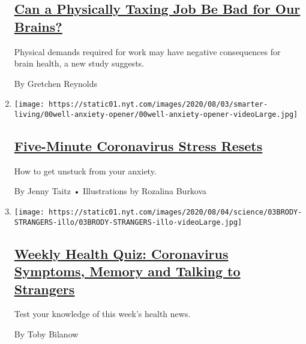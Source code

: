 \begin{enumerate}
  \hypertarget{can-a-physically-taxing-job-be-bad-for-our-brains}{%
  \subsection{\texorpdfstring{\href{/2020/08/05/well/move/can-a-physically-taxing-job-be-bad-for-our-brains.html}{Can
  a Physically Taxing Job Be Bad for Our
  Brains?}}{Can a Physically Taxing Job Be Bad for Our Brains?}}\label{can-a-physically-taxing-job-be-bad-for-our-brains}}

  Physical demands required for work may have negative consequences for
  brain health, a new study suggests.

  By Gretchen Reynolds
\item
  \texttt{[image: https://static01.nyt.com/images/2020/08/03/smarter-living/00well-anxiety-opener/00well-anxiety-opener-videoLarge.jpg]}

  \hypertarget{five-minute-coronavirus-stress-resets}{%
  \subsection{\texorpdfstring{\href{/2020/08/06/well/mind/five-minute-coronavirus-stress-resets.html}{Five-Minute
  Coronavirus Stress
  Resets}}{Five-Minute Coronavirus Stress Resets}}\label{five-minute-coronavirus-stress-resets}}

  How to get unstuck from your anxiety.

  By Jenny Taitz • Illustrations by Rozalina Burkova
\item
  \texttt{[image: https://static01.nyt.com/images/2020/08/04/science/03BRODY-STRANGERS-illo/03BRODY-STRANGERS-illo-videoLarge.jpg]}

  \hypertarget{weekly-health-quiz-coronavirus-symptoms-memory-and-talking-to-strangers}{%
  \subsection{\texorpdfstring{\href{/interactive/2020/08/07/well/live/07healthquiz-08072020.html}{Weekly
  Health Quiz: Coronavirus Symptoms, Memory and Talking to
  Strangers}}{Weekly Health Quiz: Coronavirus Symptoms, Memory and Talking to Strangers}}\label{weekly-health-quiz-coronavirus-symptoms-memory-and-talking-to-strangers}}

  Test your knowledge of this week's health news.

  By Toby Bilanow
\end{enumerate}

